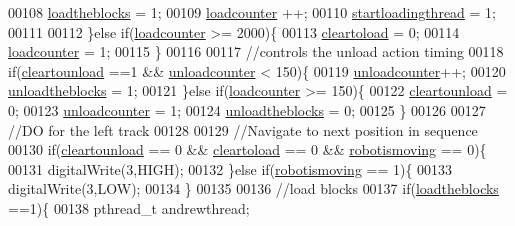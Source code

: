 \begin{DoxyCode}
00108                 \hyperlink{main_8cpp_a15cb11104a65cfea0b2667271ff359c3}{loadtheblocks} = 1;
00109                 \hyperlink{main_8cpp_adb3c9a66078375eab7d969ccd413edcd}{loadcounter} ++;
00110                 \hyperlink{main_8cpp_a0275a007a43d3231e63e3a706cd8f38a}{startloadingthread} = 1;
00111                 
00112             \}\textcolor{keywordflow}{else} \textcolor{keywordflow}{if}(\hyperlink{main_8cpp_adb3c9a66078375eab7d969ccd413edcd}{loadcounter} >= 2000)\{
00113                 \hyperlink{main_8cpp_a01a9037c5f3ab62063c4c2575609e631}{cleartoload} = 0;
00114                 \hyperlink{main_8cpp_adb3c9a66078375eab7d969ccd413edcd}{loadcounter} = 1;
00115             \}
00116             
00117             \textcolor{comment}{//controls the unload action timing}
00118             \textcolor{keywordflow}{if}(\hyperlink{main_8cpp_a805838def3ffb9fb88e0cbeeeb359ce0}{cleartounload} ==1 && \hyperlink{main_8cpp_afeb7a138c760ad09c80a38a2ab94a351}{unloadcounter} < 150)\{
00119                 \hyperlink{main_8cpp_afeb7a138c760ad09c80a38a2ab94a351}{unloadcounter}++;
00120                 \hyperlink{main_8cpp_af13d79ef80e4c7f0f8106512776ed80f}{unloadtheblocks} = 1;
00121             \}\textcolor{keywordflow}{else} \textcolor{keywordflow}{if}(\hyperlink{main_8cpp_adb3c9a66078375eab7d969ccd413edcd}{loadcounter} >= 150)\{
00122                 \hyperlink{main_8cpp_a805838def3ffb9fb88e0cbeeeb359ce0}{cleartounload} = 0;
00123                 \hyperlink{main_8cpp_afeb7a138c760ad09c80a38a2ab94a351}{unloadcounter} = 1;
00124                 \hyperlink{main_8cpp_af13d79ef80e4c7f0f8106512776ed80f}{unloadtheblocks} = 0;
00125             \}
00126             
00127 \textcolor{comment}{//DO for the left track}
00128             
00129             \textcolor{comment}{//Navigate to next position in sequence}
00130             \textcolor{keywordflow}{if}(\hyperlink{main_8cpp_a805838def3ffb9fb88e0cbeeeb359ce0}{cleartounload} == 0 && \hyperlink{main_8cpp_a01a9037c5f3ab62063c4c2575609e631}{cleartoload} == 0 && 
      \hyperlink{main_8cpp_a0f3f0f77d23894eee9ecc276cbb69df7}{robotismoving} == 0)\{
00131                 digitalWrite(3,HIGH);  
00132             \}\textcolor{keywordflow}{else} \textcolor{keywordflow}{if}(\hyperlink{main_8cpp_a0f3f0f77d23894eee9ecc276cbb69df7}{robotismoving} == 1)\{
00133                 digitalWrite(3,LOW);
00134             \}
00135             
00136             \textcolor{comment}{//load blocks }
00137             \textcolor{keywordflow}{if}(\hyperlink{main_8cpp_a15cb11104a65cfea0b2667271ff359c3}{loadtheblocks} ==1)\{
00138                 pthread\_t andrewthread;

\end{DoxyCode}
